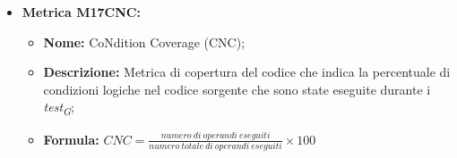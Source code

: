 \begin{itemize}
    \vspace{0.4cm}
    \item \hypertarget{item:M17CNC}{\textbf{Metrica M17CNC:}}
    \vspace{0.2cm}

    \begin{minipage}[H]{0.9\textwidth}
        \begin{itemize}
            \item \textbf{Nome:} CoNdition Coverage (CNC);
            \item \textbf{Descrizione:} Metrica di copertura del codice che indica la percentuale di condizioni logiche nel codice sorgente che sono state eseguite durante i \textit{test}\textsubscript{\textit{G}};
            \item \textbf{Formula:} $CNC = \frac{numero \ di \ operandi \ eseguiti}{numero \ totale \ di \ operandi \ eseguiti} \times 100$
        \end{itemize}
    \end{minipage}
\end{itemize}

\vspace{0.3cm}